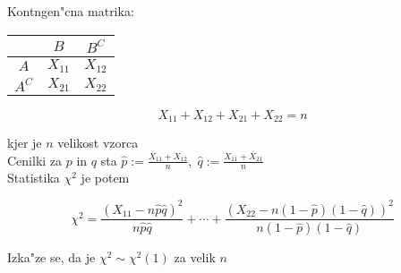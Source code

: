 \documentclass[a4paper,12pt]{article}
\theoremstyle{definition}
\theoremstyle{remark}
\begin{document}
Kontngen"cna matrika:
\begin{center}
    \begin{tabular}{c | c c} 
        & $B$ & $B^C$ \\
        \hline
        $A$ & $X_{11}$ & $X_{12}$ \\
        $A^C$ & $X_{21}$ & $X_{22}$ \\
    \end{tabular}
\end{center}

\begin{equation*}
    X_{11} + X_{12} + X_{21} + X_{22} = n
\end{equation*}

kjer je $n$ velikost vzorca \\
Cenilki za $p$ in $q$ sta $\hat{p} := \frac{X_{11} + X_{12}}{n}, \; \hat{q} := \frac{X_{11} + X_{21}}{n}$ \\
Statistika $\chi^2$ je potem

\begin{equation*}
    \chi^2 = \frac{(X_{11} - n \hat{p} \hat{q})^2}{n \hat{p} \hat{q}} + \cdots +
        \frac{(X_{22} - n (1-\hat{p}) (1-\hat{q}))^2}{n (1-\hat{p}) (1-\hat{q})}
\end{equation*}

Izka"ze se, da je $\chi^2 \sim \chi^2(1)$ za velik $n$
\end{document}
